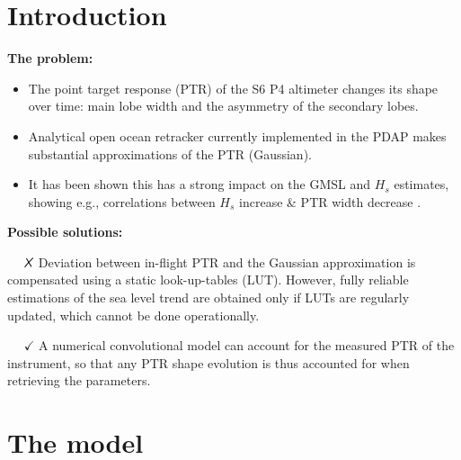 \documentclass[compress,8pt]{beamer}
\newcommand{\tikzxmark}{%
\tikz[scale=0.23] {
    \draw[line width=0.7,line cap=round] (0,0) to [bend left=6] (1,1);
    \draw[line width=0.7,line cap=round] (0.2,0.95) to [bend right=3] (0.8,0.05);
}}
\begin{document}
\section{Introduction}
\begin{frame}


{\bf The problem:}

\begin{itemize}
 \item The point target response (PTR) of the S6 P4 altimeter changes its shape over time: main lobe width and the asymmetry of the secondary lobes. 
 
\item Analytical open ocean retracker currently implemented in the PDAP makes substantial approximations of the PTR (Gaussian). 

\item It has been shown this has a strong impact on the GMSL and $H_s$ estimates, showing e.g., correlations between $H_s$ increase \& PTR width decrease \citep{Dinardo2022,Boy2022,Aublanc2021}.

\end{itemize}

\medskip

\pause
{\bf Possible solutions:}

\medskip 

$\quad$ {\Large $\tikzxmark$} Deviation between in-flight PTR and the Gaussian approximation is compensated using a static look-up-tables (LUT).   However, fully reliable estimations of the sea level trend are obtained only if LUTs are regularly updated, which cannot be done operationally. 

\medskip

$\quad$  {\Large $\checkmark$} A numerical convolutional model can account for the measured PTR of the instrument, so that any PTR shape evolution is thus accounted for when retrieving the parameters. 


\end{frame}




\section{The model}
\end{document}
